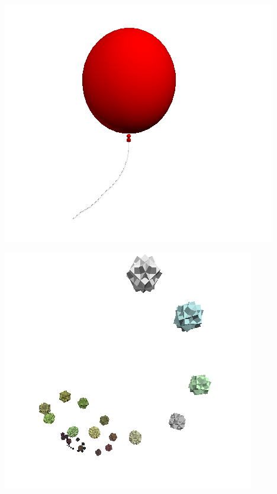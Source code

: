 \centerline{\includegraphics[scale=0.40]{../imagenes/eg23.png}}





\centerline{\includegraphics[scale=0.40]{../imagenes/eg24.png}}




